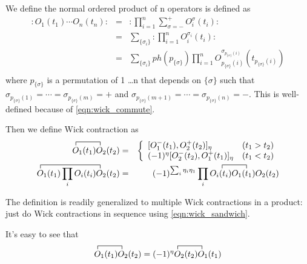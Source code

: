 \documentclass[12pt]{book}
\begin{document}
	We define the normal ordered product of n operators is defined as
	\begin{eqnarray}
		:O_1(t_1)\cdots O_n(t_n):&=&:\prod_{i=1}^n\sum_{\sigma=-}^+O_i^\sigma(t_i):\\
		&=&\sum_{\{\sigma_i\}}:\prod_{i=1}^nO_i^{\sigma_i}(t_i):\\
		&=&\sum_{\{\sigma_i\}}ph(p_{\{\sigma\}})\prod_{i=1}^nO_{p_{\{\sigma\}}(i)}^{\sigma_{p_{\{\sigma\}}(i)}}(t_{p_{\{\sigma\}}(i)})\\
	\end{eqnarray}
	where $p_{\{\sigma\}}$ is a permutation of 1 \dots n that depends on $\{\sigma\}$ such that $\sigma_{p_{\{\sigma\}}(1)}=\cdots=\sigma_{p_{\{\sigma\}}(m)}=+$ and $\sigma_{p_{\{\sigma\}}(m+1)}= \cdots=\sigma_{p_{\{\sigma\}}(n)}=-$. This is well-defined because of \ref{eqn:wick_commute}.
	
	Then we define Wick contraction as
	\begin{eqnarray}
		\contraction{}{O}{{}_1(t_1)}{O}
		O_1(t_1)O_2(t_2)&=&\left\{\begin{array}{ll}
			[O_1^-(t_1),O_2^+(t_2)]_\eta&(t_1>t_2)\\
			(-1)^\eta[O_2^-(t_2),O_1^+(t_1)]_\eta&(t_1<t_2)\\
		\end{array} \right. \\
		\contraction{}{O}{{}_1(t_1)\prod_i O_i(t_i)}{O}
		\contraction{O_1(t_1)\prod_i O_i(t_i)O_2(t_2)\quad=(-1)^{\sum_{i}\eta_i\eta_1} \prod_i O_i(t_i) }{O}{{}_1(t_1)}{O}
		O_1(t_1)\prod_i O_i(t_i)O_2(t_2)&=&(-1)^{\sum_{i}\eta_i\eta_1} \prod_i O_i(t_i) O_1(t_1)O_2(t_2) \label{eqn:wick_sandwich}
	\end{eqnarray}
	
	The definition is readily generalized to multiple Wick contractions in a product: just do Wick contractions in sequence using \ref{eqn:wick_sandwich}.
	
	It's easy to see that 
	\begin{equation}
		\contraction{}{O}{{}_1(t_1)}{O}
		\contraction{O_1(t_1)O_2(t_2)=(-1)^\eta }{O}{{}_2(t_2)}{O}
		O_1(t_1)O_2(t_2)=(-1)^\eta O_2(t_2)O_1(t_1)
	\end{equation}
	
\end{document}
